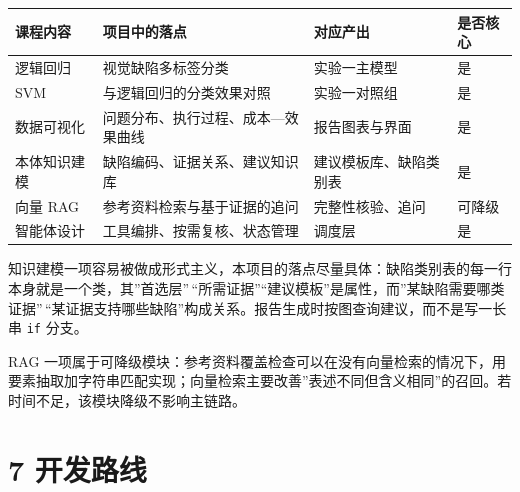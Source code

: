 \documentclass[
  11pt,
]{article}
\newcounter{none} %
\begin{document}
{\def\LTcaptype{none} %
\begin{longtable}[]{@{}
  >{\raggedright\arraybackslash}p{}
  >{\raggedright\arraybackslash}p{}
  >{\raggedright\arraybackslash}p{}
  >{\raggedright\arraybackslash}p{}@{}}
\toprule\noalign{}
\begin{minipage}[b]{\linewidth}\raggedright
课程内容
\end{minipage} & \begin{minipage}[b]{\linewidth}\raggedright
项目中的落点
\end{minipage} & \begin{minipage}[b]{\linewidth}\raggedright
对应产出
\end{minipage} & \begin{minipage}[b]{\linewidth}\raggedright
是否核心
\end{minipage} \\
\midrule\noalign{}
\endhead
\bottomrule\noalign{}
\endlastfoot
逻辑回归 & 视觉缺陷多标签分类 & 实验一主模型 & 是 \\
SVM & 与逻辑回归的分类效果对照 & 实验一对照组 & 是 \\
数据可视化 & 问题分布、执行过程、成本---效果曲线 & 报告图表与界面 &
是 \\
本体知识建模 & 缺陷编码、证据关系、建议知识库 & 建议模板库、缺陷类别表 &
是 \\
向量 RAG & 参考资料检索与基于证据的追问 & 完整性核验、追问 & 可降级 \\
智能体设计 & 工具编排、按需复核、状态管理 & 调度层 & 是 \\
\end{longtable}
}

知识建模一项容易被做成形式主义，本项目的落点尽量具体：缺陷类别表的每一行本身就是一个类，其''首选层''\,``所需证据''``建议模板''是属性，而''某缺陷需要哪类证据''\,``某证据支持哪些缺陷''构成关系。报告生成时按图查询建议，而不是写一长串
\texttt{if} 分支。

RAG
一项属于可降级模块：参考资料覆盖检查可以在没有向量检索的情况下，用要素抽取加字符串匹配实现；向量检索主要改善''表述不同但含义相同''的召回。若时间不足，该模块降级不影响主链路。

\section{7 开发路线}\label{ux5f00ux53d1ux8defux7ebf}
\end{document}
